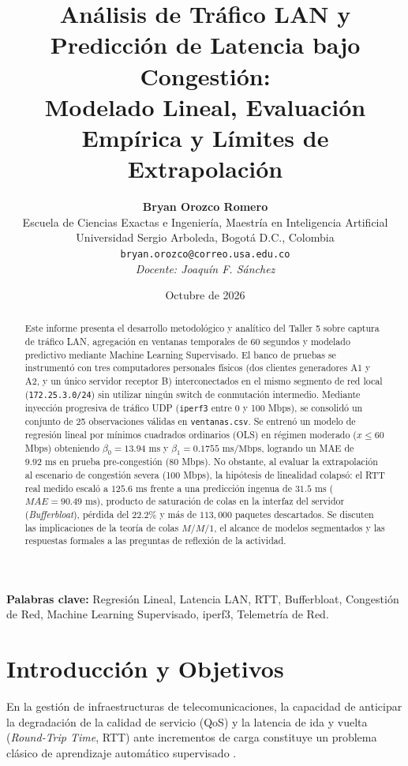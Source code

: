 \documentclass[10pt,twocolumn,letterpaper]{article}
\title{\vspace{-1.0cm}\textbf{\Large Análisis de Tráfico LAN y Predicción de Latencia bajo Congestión:\\Modelado Lineal, Evaluación Empírica y Límites de Extrapolación}}
\author{\textbf{Bryan Orozco Romero} \\
\small Escuela de Ciencias Exactas e Ingeniería, Maestría en Inteligencia Artificial \\
\small Universidad Sergio Arboleda, Bogotá D.C., Colombia \\
\small \texttt{bryan.orozco@correo.usa.edu.co} \\
\small \textit{Docente: Joaquín F. Sánchez}}
\date{\small Octubre de 2026}
\begin{document}
\maketitle

\begin{abstract}
\noindent Este informe presenta el desarrollo metodológico y analítico del Taller 5 sobre captura de tráfico LAN, agregación en ventanas temporales de 60 segundos y modelado predictivo mediante Machine Learning Supervisado. El banco de pruebas se instrumentó con tres computadores personales físicos (dos clientes generadores A1 y A2, y un único servidor receptor B) interconectados en el mismo segmento de red local (\texttt{172.25.3.0/24}) sin utilizar ningún switch de conmutación intermedio. Mediante inyección progresiva de tráfico UDP (\texttt{iperf3} entre 0 y 100 Mbps), se consolidó un conjunto de 25 observaciones válidas en \texttt{ventanas.csv}. Se entrenó un modelo de regresión lineal por mínimos cuadrados ordinarios (OLS) en régimen moderado ($x \le 60$ Mbps) obteniendo $\beta_0 = 13.94\text{ ms}$ y $\beta_1 = 0.1755\text{ ms/Mbps}$, logrando un MAE de $9.92\text{ ms}$ en prueba pre-congestión (80 Mbps). No obstante, al evaluar la extrapolación al escenario de congestión severa (100 Mbps), la hipótesis de linealidad colapsó: el RTT real medido escaló a $125.6\text{ ms}$ frente a una predicción ingenua de $31.5\text{ ms}$ ($MAE = 90.49\text{ ms}$), producto de saturación de colas en la interfaz del servidor (\textit{Bufferbloat}), pérdida del $22.2\%$ y más de $113{,}000$ paquetes descartados. Se discuten las implicaciones de la teoría de colas $M/M/1$, el alcance de modelos segmentados y las respuestas formales a las preguntas de reflexión de la actividad.
\end{abstract}

\textbf{Palabras clave:} Regresión Lineal, Latencia LAN, RTT, Bufferbloat, Congestión de Red, Machine Learning Supervisado, iperf3, Telemetría de Red.

\section{Introducción y Objetivos}
En la gestión de infraestructuras de telecomunicaciones, la capacidad de anticipar la degradación de la calidad de servicio (QoS) y la latencia de ida y vuelta (\textit{Round-Trip Time}, RTT) ante incrementos de carga constituye un problema clásico de aprendizaje automático supervisado \cite{hurbans2020grokking}.
\end{document}

